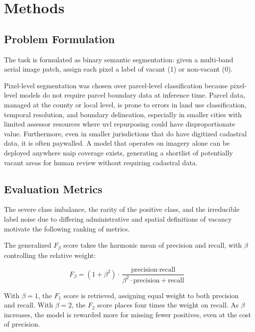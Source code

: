 \chapter{Methods}
\label{ch:methods}

\section{Problem Formulation}
\label{sec:problem}

The task is formulated as binary semantic segmentation: given a multi-band aerial image patch, assign each pixel a label of vacant (1) or non-vacant (0).

Pixel-level segmentation was chosen over parcel-level classification because pixel-level models do not require parcel boundary data at inference time. Parcel data, managed at the county or local level, is prone to errors in land use classification, temporal resolution, and boundary delineation, especially in smaller cities with limited assessor resources where \acrshort{uvl} repurposing could have disproportionate value. Furthermore, even in smaller jurisdictions that do have digitized cadastral data, it is often paywalled. A model that operates on imagery alone can be deployed anywhere \acrshort{naip} coverage exists, generating a shortlist of potentially vacant areas for human review without requiring cadastral data.

\section{Evaluation Metrics}
\label{sec:metrics}

The severe class imbalance, the rarity of the positive class, and the irreducible label noise due to differing administrative and spatial definitions of vacancy motivate the following ranking of metrics.

The generalized $F_\beta$ score takes the harmonic mean of precision and recall, with $\beta$ controlling the relative weight:

\begin{equation}
  F_\beta = (1 + \beta^2) \cdot \frac{\text{precision} \cdot \text{recall}}{\beta^2 \cdot \text{precision} + \text{recall}}
  \label{eq:fbeta}
\end{equation}

With $\beta = 1$, the $F_1$ score is retrieved, assigning equal weight to both precision and recall. With $\beta = 2$, the $F_2$ score places four times the weight on recall. As $\beta$ increases, the model is rewarded more for missing fewer positives, even at the cost of precision.

